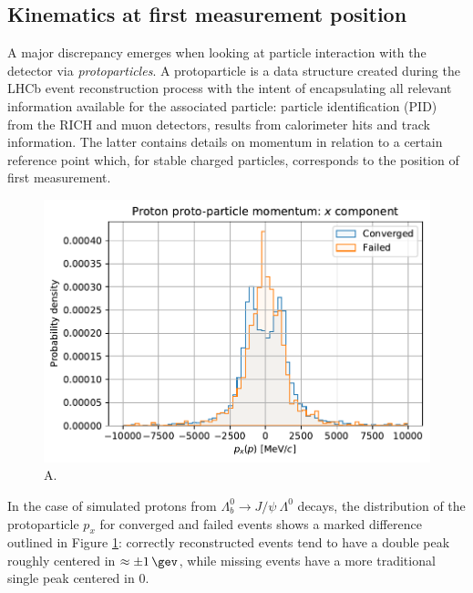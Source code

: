 \subsection{Kinematics at first measurement position}
\label{sec:3:kinematics_at_first_meas}
A major discrepancy emerges when looking at particle interaction with the detector via \textit{protoparticles}.
A protoparticle is a data structure created during the LHCb event reconstruction process with the intent of encapsulating all relevant information available for the associated particle:
particle identification (PID) from the RICH and muon detectors, results from calorimeter hits and track information.
The latter contains details on momentum in relation to a certain reference point which, for stable charged particles, corresponds to the position of first measurement.

\begin{figure}[t]
	\centering
	\includegraphics[width=.6\textwidth]{graphics/03-vertex_reconstruction/pp_p_momentum_x.pdf}
	\caption{A.}
	\label{fig:pp_p_px_conv_vs_failed}
\end{figure}

In the case of simulated protons from $\Lambda_b^0 \rightarrow J/\psi~\Lambda^0$ decays, the distribution of the
protoparticle $p_x$ for converged and failed events shows a marked difference outlined in Figure \ref{fig:pp_p_px_conv_vs_failed}:
correctly reconstructed events tend to have a double peak roughly centered in $\approx \pm \SI{1}{\gev}$, while missing events have a more traditional single peak centered in $0$.

